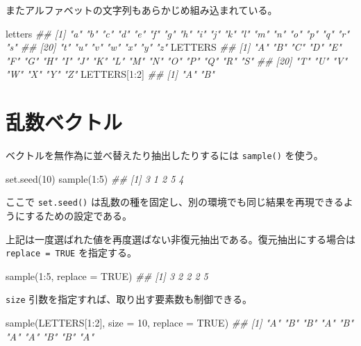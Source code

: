 \documentclass[
  letterpaper,
  xelatex,
  ja=standard, xelatex]{bxjsbook}
\newenvironment{Shaded}{\begin{snugshade}}{\end{snugshade}}
\newcommand{\AttributeTok}[1]{\textcolor[rgb]{0.40,0.45,0.13}{#1}}
\newcommand{\ConstantTok}[1]{\textcolor[rgb]{0.56,0.35,0.01}{#1}}
\newcommand{\DecValTok}[1]{\textcolor[rgb]{0.68,0.00,0.00}{#1}}
\newcommand{\DocumentationTok}[1]{\textcolor[rgb]{0.37,0.37,0.37}{\textit{#1}}}
\newcommand{\FunctionTok}[1]{\textcolor[rgb]{0.28,0.35,0.67}{#1}}
\newcommand{\NormalTok}[1]{\textcolor[rgb]{0.00,0.23,0.31}{#1}}
\newcommand{\SpecialCharTok}[1]{\textcolor[rgb]{0.37,0.37,0.37}{#1}}
\begin{document}
またアルファベットの文字列もあらかじめ組み込まれている。

\begin{Shaded}
\begin{Highlighting}[]
\NormalTok{letters}
\DocumentationTok{\#\#  [1] "a" "b" "c" "d" "e" "f" "g" "h" "i" "j" "k" "l" "m" "n" "o" "p" "q" "r" "s"}
\DocumentationTok{\#\# [20] "t" "u" "v" "w" "x" "y" "z"}
\NormalTok{LETTERS}
\DocumentationTok{\#\#  [1] "A" "B" "C" "D" "E" "F" "G" "H" "I" "J" "K" "L" "M" "N" "O" "P" "Q" "R" "S"}
\DocumentationTok{\#\# [20] "T" "U" "V" "W" "X" "Y" "Z"}
\NormalTok{LETTERS[}\DecValTok{1}\SpecialCharTok{:}\DecValTok{2}\NormalTok{]}
\DocumentationTok{\#\# [1] "A" "B"}
\end{Highlighting}
\end{Shaded}

\section{乱数ベクトル}\label{ux4e71ux6570ux30d9ux30afux30c8ux30eb}

ベクトルを無作為に並べ替えたり抽出したりするには \texttt{sample()}
を使う。

\begin{Shaded}
\begin{Highlighting}[]
\FunctionTok{set.seed}\NormalTok{(}\DecValTok{10}\NormalTok{)}
\FunctionTok{sample}\NormalTok{(}\DecValTok{1}\SpecialCharTok{:}\DecValTok{5}\NormalTok{)}
\DocumentationTok{\#\# [1] 3 1 2 5 4}
\end{Highlighting}
\end{Shaded}

ここで \texttt{set.seed()}
は乱数の種を固定し、別の環境でも同じ結果を再現できるようにするための設定である。

上記は一度選ばれた値を再度選ばない非復元抽出である。復元抽出にする場合は
\texttt{replace\ =\ TRUE} を指定する。

\begin{Shaded}
\begin{Highlighting}[]
\FunctionTok{sample}\NormalTok{(}\DecValTok{1}\SpecialCharTok{:}\DecValTok{5}\NormalTok{, }\AttributeTok{replace =} \ConstantTok{TRUE}\NormalTok{)}
\DocumentationTok{\#\# [1] 3 2 2 2 5}
\end{Highlighting}
\end{Shaded}

\texttt{size} 引数を指定すれば、取り出す要素数も制御できる。

\begin{Shaded}
\begin{Highlighting}[]
\FunctionTok{sample}\NormalTok{(LETTERS[}\DecValTok{1}\SpecialCharTok{:}\DecValTok{2}\NormalTok{], }\AttributeTok{size =} \DecValTok{10}\NormalTok{, }\AttributeTok{replace =} \ConstantTok{TRUE}\NormalTok{)}
\DocumentationTok{\#\#  [1] "A" "B" "B" "A" "B" "A" "A" "B" "B" "A"}
\end{Highlighting}
\end{Shaded}
\end{document}
